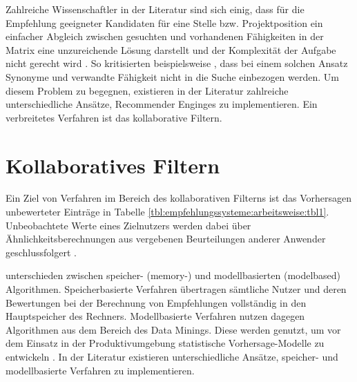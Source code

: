 Zahlreiche Wissenschaftler in der Literatur sind sich einig, dass für die Empfehlung geeigneter Kandidaten für eine Stelle bzw. Projektposition ein einfacher Abgleich zwischen gesuchten und vorhandenen Fähigkeiten in der Matrix eine unzureichende Lösung darstellt \cite[S. 1]{enhancingERecruitment:2012}\cite[S. 1]{faerber:2003}\cite[S. 2]{prospect:2010} und der Komplexität der Aufgabe nicht gerecht wird \cite[S. 1]{malinowski:2008}. So kritisierten beispielsweise \textcite[S. 1f.]{mitre:2014}, dass bei einem solchen Ansatz Synonyme und verwandte Fähigkeit nicht in die Suche einbezogen werden. Um diesem Problem zu begegnen, existieren in der Literatur zahlreiche unterschiedliche Ansätze, Recommender Enginges zu implementieren. Ein verbreitetes Verfahren ist das kollaborative Filtern.

\section{Kollaboratives Filtern}
\label{ch:empfehlungssysteme:cf}
Ein Ziel von Verfahren im Bereich des kollaborativen Filterns ist das Vorhersagen unbewerteter Einträge in Tabelle \ref{tbl:empfehlungssysteme:arbeitsweise:tbl1}. Unbeobachtete Werte eines Zielnutzers werden dabei über Ähnlichkeitsberechnungen aus vergebenen Beurteilungen anderer Anwender geschlussfolgert \cite[S. 1]{su:2009}.

\textcite[S. 3]{breese:1998} unterschieden zwischen speicher- (memory-) und modellbasierten (modelbased) Algorithmen. Speicherbasierte Verfahren übertragen sämtliche Nutzer und deren Bewertungen bei der Berechnung von Empfehlungen vollständig in den Hauptspeicher des Rechners. Modellbasierte Verfahren nutzen dagegen Algorithmen aus dem Bereich des Data Minings. Diese werden genutzt, um vor dem Einsatz in der Produktivumgebung statistische Vorhersage-Modelle zu entwickeln \cite[S. 3]{breese:1998}\cite[S. 11]{schafer:2007}. In der Literatur existieren unterschiedliche Ansätze, speicher- und modellbasierte Verfahren zu implementieren.


